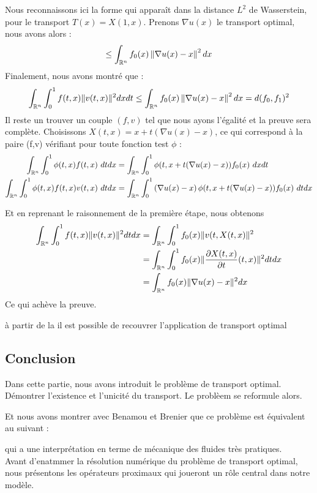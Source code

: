 \documentclass[a4paper,12pt]{article}
\begin{document}
\begin{preuve}
Nous reconnaissons ici la forme qui apparaît dans la distance $L^2$ de Wasserstein, pour le transport $T(x) = X(1,x)$. Prenons $\nabla u(x)$ le transport optimal, nous avons alors :  
$$
\leq \int_{\mathbb{R}^n} f_0(x)\left\| \nabla u(x)-x \right\|^2dx
$$
Finalement, nous avons montré que : 
$$
\int_{\mathbb{R}^n}\int_0^1 f(t,x)\|v(t,x)\|^2dxdt \leq \int_{\mathbb{R}^n} f_0(x)\left\| \nabla u(x)-x \right\|^2dx = d(f_0,f_1)^2
$$
Il reste un trouver un couple $(f,v)$ tel que nous ayons l'égalité et la preuve sera complète. Choisissons $X(t,x) = x+t(\nabla u(x)-x)$, ce qui correspond à la paire (f,v) vérifiant pour toute fonction test $\phi$ : 
\begin{align*}
\int_{\mathbb{R}^n} \int_0^1 \phi(t,x)f(t,x)\ dtdx &=\int_{\mathbb{R}^n} \int_0^1 \phi(t, x+t(\nabla u(x)-x)) f_0(x)\ dxdt \\
\int_{\mathbb{R}^n} \int_0^1 \phi (t,x)f(t,x)v(t,x)\ dtdx &= \int_{\mathbb{R}^n} \int_0^1 \left(\nabla u (x) - x\right) \phi(t, x+t(\nabla u(x)-x)) f_0(x)\ dtdx
\end{align*}


Et en reprenant le raisonnement de la première étape, nous obtenons
\begin{align*}
\int_{\mathbb{R}^n} \int_0^1 f(t,x)\|v(t,x)\|^2dtdx &= \int_{\mathbb{R}^n} \int_0^1 f_0(x)\|v(t,X(t,x)\|^2\\
&= \int_{\mathbb{R}^n} \int_0^1 f_0(x) \|\frac{\partial X(t,x)}{\partial t}(t,x)\|^2 dtdx \\
&= \int_{\mathbb{R}^n} f_0(x) \|\nabla u(x) -x\|^2dx \\
\end{align*}
Ce qui achève la preuve. 
\end{preuve}

{\Huge à partir de la il est possible de recouvrer l'application de transport optimal}




\subsection{Conclusion}
Dans cette partie, nous avons introduit le problème de transport optimal. Démontrer l'existence et l'unicité du transport. 
Le problèem se reformule alors. 

Et nous avons montrer avec Benamou et Brenier que ce problème est équivalent au suivant : 

qui a une interprétation en terme de mécanique des fluides très pratiques. \\

Avant d'enatmmer la résolution numérique du problème de transport optimal, nous présentons les opérateurs proximaux qui joueront un rôle central dans notre modèle. 
\end{document}
